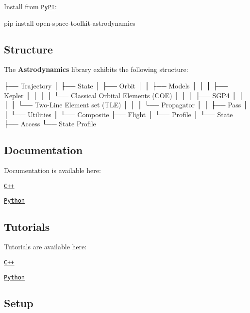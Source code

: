 Install from \href{https://pypi.org/project/open-space-toolkit-astrodynamics/}{\tt Py\+PI}\+:


\begin{DoxyCode}
pip install open-space-toolkit-astrodynamics
\end{DoxyCode}


\subsection*{Structure}

The {\bfseries Astrodynamics} library exhibits the following structure\+:


\begin{DoxyCode}
├── Trajectory
│   ├── State
│   ├── Orbit
│   │   ├── Models
│   │   │   ├── Kepler
│   │   │   │   └── Classical Orbital Elements (COE)
│   │   │   ├── SGP4
│   │   │   │   └── Two-Line Element \textcolor{keyword}{set} (TLE)
│   │   │   └── Propagator
│   │   ├── Pass
│   │   └── Utilities
│   └── Composite
├── Flight
│   └── Profile
│       └── State
├── Access
└── State Profile
\end{DoxyCode}


\subsection*{Documentation}

Documentation is available here\+:


\begin{DoxyItemize}
\item \href{https://open-space-collective.github.io/open-space-toolkit-astrodynamics}{\tt C++}
\item \href{./bindings/python/docs}{\tt Python}
\end{DoxyItemize}

\subsection*{Tutorials}

Tutorials are available here\+:


\begin{DoxyItemize}
\item \href{./tutorials/cpp}{\tt C++}
\item \href{./tutorials/python}{\tt Python}
\end{DoxyItemize}

\subsection*{Setup}

